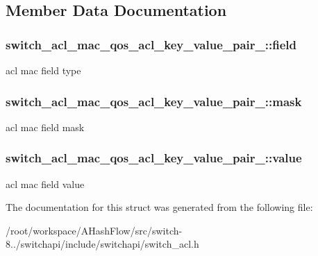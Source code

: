 \subsection{Member Data Documentation}
\hypertarget{structswitch__acl__mac__qos__acl__key__value__pair___a677a05f6151851ae711e707dcaac0dcc}{
\subsubsection[{field}]{ switch\+\_\+acl\+\_\+mac\+\_\+qos\+\_\+acl\+\_\+key\+\_\+value\+\_\+pair\+\_\+\+::field}}\label{structswitch__acl__mac__qos__acl__key__value__pair___a677a05f6151851ae711e707dcaac0dcc}
acl mac field type \hypertarget{structswitch__acl__mac__qos__acl__key__value__pair___a92f434dac2744c188b8d2e9c6c5e6a0d}{
\subsubsection[{mask}]{ switch\+\_\+acl\+\_\+mac\+\_\+qos\+\_\+acl\+\_\+key\+\_\+value\+\_\+pair\+\_\+\+::mask}}\label{structswitch__acl__mac__qos__acl__key__value__pair___a92f434dac2744c188b8d2e9c6c5e6a0d}
acl mac field mask \hypertarget{structswitch__acl__mac__qos__acl__key__value__pair___abfc569e14c4dd1420298b0983d318d46}{
\subsubsection[{value}]{ switch\+\_\+acl\+\_\+mac\+\_\+qos\+\_\+acl\+\_\+key\+\_\+value\+\_\+pair\+\_\+\+::value}}\label{structswitch__acl__mac__qos__acl__key__value__pair___abfc569e14c4dd1420298b0983d318d46}
acl mac field value 

The documentation for this struct was generated from the following file\+:\begin{DoxyCompactItemize}
\item 
/root/workspace/\+A\+Hash\+Flow/src/switch-\/8../switchapi/include/switchapi/switch\+\_\+acl.\+h\end{DoxyCompactItemize}
